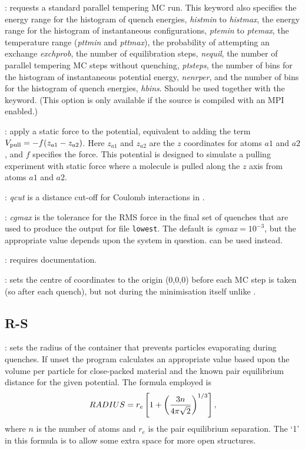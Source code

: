 : 
requests a standard parallel tempering MC run.
This keyword also specifies the energy range for the histogram of quench energies,
{\it histmin\/} to {\it histmax\/},
the energy range for the histogram of instantaneous configurations, {\it ptemin} to {\it ptemax}, 
the temperature range ({\it pttmin} and {\it pttmax}), 
the probability of attempting an exchange {\it exchprob}, the 
number of equilibration steps, {\it nequil},
the number of parallel tempering MC steps without quenching,  {\it ptsteps},
the number of bins for the histogram of instantaneous potential energy, {\it nenrper}, and
the number of bins for the histogram of quench energies, {\it hbins}.
Should be used together with the {\/} keyword. %
(This option is only available if the source is compiled with an MPI enabled.)  

: apply a static force to the potential, equivalent to adding
the term $V_{\rm pull}=-f(z_{a1}-z_{a2})$. Here $z_{a1}$ and $z_{a2}$ are the $z$
coordinates for atoms $a1$ and $a2$, and $f$ specifies the force.
This potential is designed to simulate a pulling experiment with static force where
a molecule is pulled along the $z$ axis from atoms $a1$ and $a2$.

: {\it qcut\/} is a distance cut-off for Coulomb interactions in {\/}.

: {\it cgmax\/} is the tolerance for the 
RMS force in the final set of quenches that are used to produce
the output for file {\tt lowest}. The default is 
{\it cgmax\/}$=10^{-3}$, but the appropriate value depends upon the system in question.
 can be used instead.

: requires documentation.

: sets the centre of coordinates to the origin (0,0,0) before each MC step is taken (so after each quench), but not during the minimisation itself unlike {}. 

\subsection{R-S}
: sets the radius of the container that prevents particles
evaporating during quenches. If unset the program calculates an appropriate value
based upon the volume per particle for close-packed material and the known pair
equilibrium distance for the given potential. The formula employed is
$$  RADIUS=r_e\left[1 + \left(3 n \over 4\pi\sqrt{2}\right)^{1/3}\right], $$
where $n$ is the number of atoms and $r_e$ is the pair equilibrium
separation.\cite{kittel76} The `1' in this formula is to allow some extra space for
more open structures.

